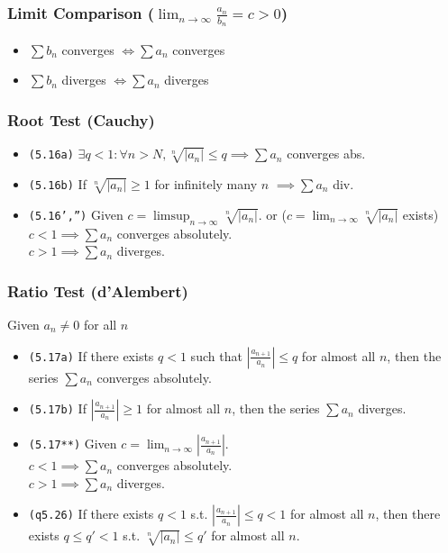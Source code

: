 \documentclass[a4paper,landscape]{article}
\newcommand{\tnum}[1]{{\color{gray}\footnotesize\texttt{(#1)}}}
\begin{document}
\begin{multicols}{2}
\subsubsection{Limit Comparison ({\small $\displaystyle\lim_{n\to\infty} \frac{a_n}{b_n} = c > 0$})}

\begin{itemize}
\item $\sum b_n$ converges $\iff \sum a_n$ converges
\item  $\sum b_n$ diverges $\iff \sum a_n$ diverges 
\end{itemize}

\subsubsection{Root Test (Cauchy)}

\begin{itemize}

\item \tnum{5.16a}  $\exists q<1:\forall n> N,\sqrt[n]{|a_n|}\leq q\implies\sum a_n$ converges abs. 
\item \tnum{5.16b} If $\sqrt[n]{|a_n|}\geq 1$ for infinitely many $n$  $\implies\sum a_n$ div.

\item \tnum{5.16',''} Given $c=\displaystyle\limsup_{n\to\infty}\sqrt[n]{|a_n|}$. or ($c=\displaystyle\lim_{n\to\infty}\sqrt[n]{|a_n|}$ exists) \\
    $c<1\implies\sum a_n$ converges absolutely.\\
    $c>1\implies\sum a_n$ diverges.
\end{itemize}

\columnbreak

\subsubsection{Ratio Test (d'Alembert)}
Given $a_n\neq0$ for all $n$

\begin{itemize}


\item \tnum{5.17a} If there exists $q<1$ such that $\left|\frac{a_{n+1}}{a_n}\right|\leq q$ for almost all $n$, then the series $\sum a_n$ converges absolutely.
\item \tnum{5.17b} If $\left|\frac{a_{n+1}}{a_n}\right|\geq 1$ for almost all $n$, then the series $\sum a_n$ diverges.    
\item \tnum{5.17**} Given $c=\lim_{n\to\infty}\left|\frac{a_{n+1}}{a_n}\right|$.
    \\ $c<1\implies\sum a_n$ converges absolutely.
    \\ $c>1\implies\sum a_n$ diverges.
\item \tnum{q5.26} If there exists $q<1$ s.t. $\left|\frac{a_{n+1}}{a_n}\right|\leq q<1$ for almost all $n$, then there exists $q\leq q'<1$ s.t. $\sqrt[n]{|a_n|}\leq q'$ for almost all $n$.
\end{itemize}




\end{multicols}
\end{document}
